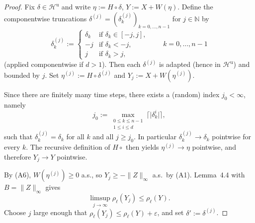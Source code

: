 \documentclass[11pt,a4paper]{report}
\numberwithin{equation}{chapter}
\theoremstyle{plain}
\theoremstyle{definition}
\newcommand{\N}{\mathbb{N}}
\newcommand{\Hu}{\mathcal{H}^{\mathrm{u}}}
\begin{document}
\begin{proof}
  Fix $\delta\in\Hu$ and write $\eta:=H\circ\delta$, $Y:=X+W(\eta)$.
  Define the componentwise truncations $\delta^{(j)}=(\delta^{(j)}_k)_{k=0,\dots,n-1}$
  for $j\in\N$ by
  \[
    \delta^{(j)}_k:=
    \begin{cases}
      \delta_k & \text{if }\delta_k\in[-j,j], \\
      -j       & \text{if }\delta_k<-j,       \\
      j        & \text{if }\delta_k>j,
    \end{cases}
    \qquad k=0,\dots,n-1
  \]
  (applied componentwise if $d>1$). Then each $\delta^{(j)}$ is adapted
  (hence in $\Hu$) and bounded by $j$. Set
  $\eta^{(j)}:=H\circ\delta^{(j)}$ and $Y_j:=X+W(\eta^{(j)})$.

  Since there are finitely many time steps, there exists a (random) index
  $j_0<\infty$, namely
  \[
    j_0
    :=
    \max_{\substack{0\le k\le n-1\\ 1\le i\le d}}
    \bigl\lceil\bigl|\delta_k^i\bigr|\bigr\rceil,
  \]
  such that $\delta^{(j)}_k=\delta_k$ for all $k$ and all $j\ge j_0$. In
  particular $\delta^{(j)}_k\to\delta_k$ pointwise for every $k$. The
  recursive definition of $H\circ{}$ then yields $\eta^{(j)}\to\eta$
  pointwise, and therefore $Y_j\to Y$ pointwise.

  By (A6), $W(\eta^{(j)})\ge0$ a.s., so $Y_j\ge-\|Z\|_\infty$ a.s.\ by
  (A1). Lemma~4.4 with $B=\|Z\|_\infty$ gives
  \[
    \limsup_{j\to\infty}\rho_\ell(Y_j)\le\rho_\ell(Y).
  \]
  Choose $j$ large enough that $\rho_\ell(Y_j)\le\rho_\ell(Y)+\varepsilon$,
  and set $\delta':=\delta^{(j)}$.
\end{proof}
\end{document}
